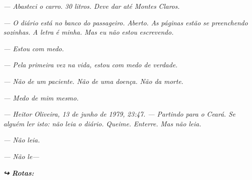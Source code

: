 \noindent \textit{--- Abasteci o carro. 30 litros. Deve dar até Montes Claros.}

\noindent \textit{--- O diário está no banco do passageiro. Aberto. As páginas estão se preenchendo sozinhas. A letra é minha. Mas eu não estou escrevendo.}

\noindent \textit{--- Estou com medo.}

\noindent \textit{--- Pela primeira vez na vida, estou com medo de verdade.}

\noindent \textit{--- Não de um paciente. Não de uma doença. Não da morte.}

\noindent \textit{--- Medo de mim mesmo.}

\noindent \textit{--- Heitor Oliveira, 13 de junho de 1979, 23:47.}
\textit{--- Partindo para o Ceará. Se alguém ler isto: não leia o diário. Queime. Enterre. Mas não leia.}

\noindent \textit{--- Não leia.}

\noindent \textit{--- Não le---}

\vspace{0.5em}
\noindent\textit{\textbf{↪ Rotas:}  \rotasep {} \rotasep {}}